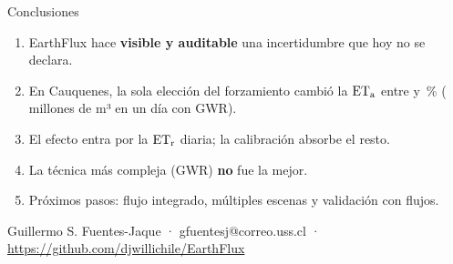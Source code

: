 \begin{frame}{Conclusiones}
\begin{enumerate}
  \item EarthFlux hace \textbf{visible y auditable} una incertidumbre que hoy no se declara.
  \item En Cauquenes, la sola elección del forzamiento cambió la $\mathrm{ET_a}$ entre \DEtaCThreeGWRPct{} y \DEtaCTwoIDWPct\,\% (\VolDiffAbsCThreeGWR{} millones de m³ en un día con GWR).
  \item El efecto entra por la $\mathrm{ET_r}$ diaria; la calibración absorbe el resto.
  \item La técnica más compleja (GWR) \textbf{no} fue la mejor.
  \item Próximos pasos: flujo integrado, múltiples escenas y validación con flujos.
\end{enumerate}
\vfill
\centering\small Guillermo S. Fuentes-Jaque · gfuentesj@correo.uss.cl · \url{https://github.com/djwillichile/EarthFlux}
\end{frame}
